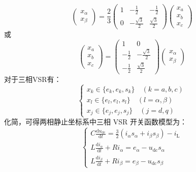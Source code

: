 \begin{equation}
	\begin{pmatrix}
		x_{\alpha } \\
		x_{\beta }
	\end{pmatrix}
	=
	\frac{2}{3}
	\begin{pmatrix}
		1 & -\frac{1}{2}         & -\frac{1}{2}        \\
		0 & -\frac{\sqrt{3} }{2} & \frac{\sqrt{3} }{2}
	\end{pmatrix}
	\begin{pmatrix}
		x_{a} \\
		x_{b} \\
		x_{c}
	\end{pmatrix}
	\label{equ:abc2αβ}
\end{equation}
或
\begin{equation}
	\begin{pmatrix}
		x_{a} \\
		x_{b} \\
		x_{c}
	\end{pmatrix}
	=
	\begin{pmatrix}
		1            & 0                    \\
		-\frac{1}{2} & -\frac{\sqrt{3} }{2} \\
		-\frac{1}{2} & \frac{\sqrt{3} }{2}
	\end{pmatrix}
	\begin{pmatrix}
		x_{\alpha } \\
		x_{\beta }
	\end{pmatrix}
\end{equation}
对于三相VSR有：
\begin{equation}
	\begin{cases}
		x_{k}\in  \{ e_{k},e_{k},s_{k} \} \quad(k=a,b,c)          \\
		x_{l}\in  \{ e_{l},e_{l},s_{l} \} \quad(l=\alpha ,\beta ) \\
		x_{j}\in  \{ e_{j},e_{j},s_{j} \} \quad(j=d,q)
	\end{cases}
\end{equation}
化简，可得两相静止坐标系中三相 VSR 开关函数模型为：
\begin{equation}
	\begin{cases}
		C \frac{\mathrm{d} u_{\mathrm{dc}}}{\mathrm{d} t}=\frac{3}{2}\left(i_{\alpha} s_{\alpha}+i_{\beta} s_{\beta}\right)-i_{\mathrm{L}} \\
		L \frac{\mathrm{d} i_{\alpha}}{\mathrm{d} t}+R i_{\alpha}=e_{\alpha}-u_{\mathrm{dc}} s_{\alpha}                                    \\
		L \frac{\mathrm{d} i_{\beta}}{\mathrm{d} t}+R i_{\beta}=e_{\beta}-u_{\mathrm{dc}} s_{\beta}
	\end{cases}
	\label{equ:3-17}
\end{equation}
